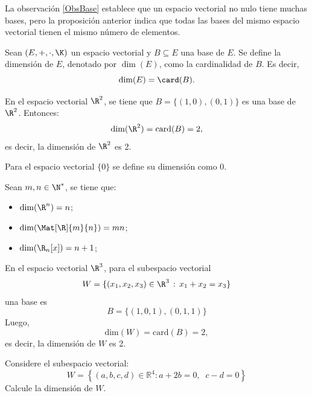 \documentclass[compacto,10pt]{pubciencias-notas}
\begin{document}
\begin{obs}
La observación \ref{ObsBase} establece que un espacio vectorial no nulo tiene muchas bases, pero la proposición anterior indica que todas las bases del mismo espacio vectorial tienen el mismo número de elementos.
\end{obs}

\begin{defi}[Dimensión]
    Sean $(E,+,\cdot,\K)$ un espacio vectorial y $B\subseteq E$ una base de $E$. Se define la dimensión de $E$, denotado por $\dim(E)$, como la cardinalidad de $B$. Es decir,
    \[
        \dim(E) = \card(B).
    \]
\end{defi}

\begin{ejem}\hspace{0pt}
En el espacio vectorial $\R^{2}$, se tiene que $B = \{(1,0),(0, 1)\}$ es una base de $\R^{2}$. Entonces:
\[
    \text{dim}(\R^{2})= \text{card}(B)=2,
\]
es decir, la dimensión de $\R^{2}$ es 2.
\end{ejem} 


\begin{obs}
Para el espacio vectorial $\{0\}$ se define su dimensión como 0.
\end{obs}

\begin{ejem}\hspace{0pt}
Sean $m, n\in\N^{*}$, se tiene que:
    \begin{itemize}
    \item
        $\dim(\R^n)=n$;
    \item
        $\dim(\Mat[\R]{m}{n})=mn$;
    \item
        $\dim(\R_n[x])=n+1$;
    \end{itemize}
\end{ejem}

\begin{ejem}\hspace{0pt}
En el espacio vectorial $\R^{3}$, para el subespacio vectorial 
\[
    W = \{(x_{1}, x_{2}, x_{3})\in\R^{3}\,:\,x_{1} + x_{2} = x_{3}\}
\]
una base es
\[
    B = \{(1,0,1),(0, 1,1)\}
\]
Luego,
\[
    \text{dim}(W)= \text{card}(B)=2,
\]
es decir, la dimensión de $W$ es 2.
\end{ejem}

\begin{ejer}\hspace{0pt}
Considere el subespacio vectorial:
\[W=\left\{ (a,b,c,d) \in \mathbb{R}^{4} : a+2b=0,\;\; c-d=0 \right\}\]
Calcule la dimensión de $W$.
\end{ejer}
\end{document}
